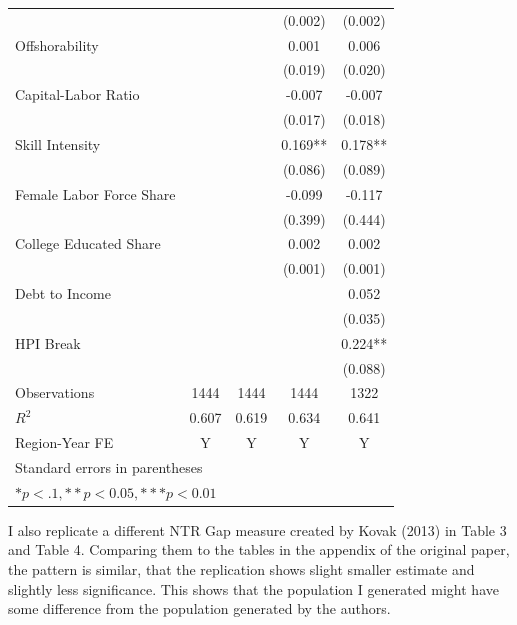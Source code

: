 \documentclass[12pt, final]{CSP}
\begin{document}
\begin{table}[htbp]
\begin{tabular}{l*{4}{c}}
                    &            &            &  (0.002)   &  (0.002)   \\
\addlinespace
Offshorability      &            &            &    0.001   &    0.006   \\
                    &            &            &  (0.019)   &  (0.020)   \\
\addlinespace
Capital-Labor Ratio &            &            &   -0.007   &   -0.007   \\
                    &            &            &  (0.017)   &  (0.018)   \\
\addlinespace
Skill Intensity     &            &            &    0.169** &    0.178** \\
                    &            &            &  (0.086)   &  (0.089)   \\
\addlinespace
Female Labor Force Share&            &            &   -0.099   &   -0.117   \\
                    &            &            &  (0.399)   &  (0.444)   \\
\addlinespace
College Educated Share&            &            &    0.002   &    0.002   \\
                    &            &            &  (0.001)   &  (0.001)   \\
\addlinespace
Debt to Income      &            &            &            &    0.052   \\
                    &            &            &            &  (0.035)   \\
\addlinespace
HPI Break           &            &            &            &    0.224** \\
                    &            &            &            &  (0.088)   \\
\midrule
Observations        &     1444   &     1444   &     1444   &     1322   \\
\(R^{2}\)           &    0.607   &    0.619   &    0.634   &    0.641   \\
Region-Year FE      &        Y   &        Y   &        Y   &        Y   \\
\hline
\bottomrule
\multicolumn{5}{l}{\footnotesize Standard errors in parentheses}\\
\multicolumn{5}{l}{\footnotesize $*p<.1, ** p<0.05, *** p<0.01$}\\
\end{tabular}
\end{table}

\noindent
I also replicate a different NTR Gap measure created by Kovak (2013) \cite{kovak2013regional} in Table 3 and Table 4. Comparing them to the tables in the appendix of the original paper, the pattern is similar, that the replication shows slight smaller estimate and slightly less significance. This shows that the population I generated might have some difference from the population generated by the authors.
\newline
\newline
\end{document}

